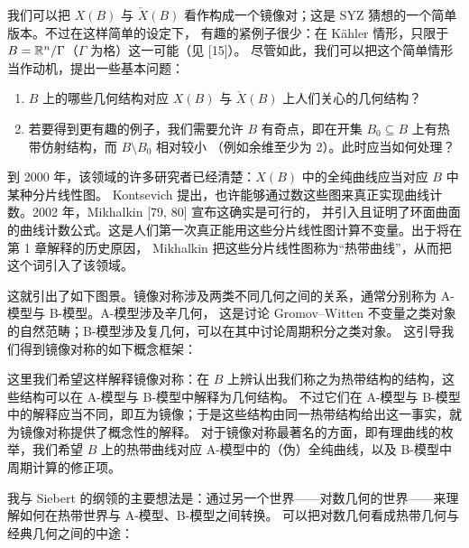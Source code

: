 我们可以把 $X(B)$ 与 $\check X(B)$ 看作构成一个镜像对；这是 SYZ 猜想的一个简单版本。不过在这样简单的设定下，
有趣的紧例子很少：在 Kähler 情形，只限于 $B=\mathbb{R}^n/\Gamma$（$\Gamma$ 为格）这一可能（见 [15]）。
尽管如此，我们可以把这个简单情形当作动机，提出一些基本问题：
\begin{enumerate}[leftmargin=1.6em]
\item $B$ 上的哪些几何结构对应 $X(B)$ 与 $\check X(B)$ 上人们关心的几何结构？
\item 若要得到更有趣的例子，我们需要允许 $B$ 有奇点，即在开集 $B_0\subseteq B$ 上有热带仿射结构，而 $B\setminus B_0$ 相对较小
（例如余维至少为 2）。此时应当如何处理？
\end{enumerate}

到 2000 年，该领域的许多研究者已经清楚：$X(B)$ 中的全纯曲线应当对应 $B$ 中某种分片线性图。
Kontsevich 提出，也许能够通过数这些图来真正实现曲线计数。2002 年，Mikhalkin [79, 80] 宣布这确实是可行的，
并引入且证明了环面曲面的曲线计数公式。这是人们第一次真正能用这些分片线性图计算不变量。出于将在第 1 章解释的历史原因，
Mikhalkin 把这些分片线性图称为“热带曲线”，从而把这个词引入了该领域。

这就引出了如下图景。镜像对称涉及两类不同几何之间的关系，通常分别称为 A-模型与 B-模型。A-模型涉及辛几何，
这是讨论 Gromov--Witten 不变量之类对象的自然范畴；B-模型涉及复几何，可以在其中讨论周期积分之类对象。
这引导我们得到镜像对称的如下概念框架：
\begin{center}
\end{center}
这里我们希望这样解释镜像对称：在 $B$ 上辨认出我们称之为热带结构的结构，这些结构可以在 A-模型与 B-模型中解释为几何结构。
不过它们在 A-模型与 B-模型中的解释应当不同，即互为镜像；于是这些结构由同一热带结构给出这一事实，就为镜像对称提供了概念性的解释。
对于镜像对称最著名的方面，即有理曲线的枚举，我们希望 $B$ 上的热带曲线对应 A-模型中的（伪）全纯曲线，以及 B-模型中周期计算的修正项。

我与 Siebert 的纲领的主要想法是：通过另一个世界——对数几何的世界——来理解如何在热带世界与 A-模型、B-模型之间转换。
可以把对数几何看成热带几何与经典几何之间的中途：
\begin{center}
\end{center}

